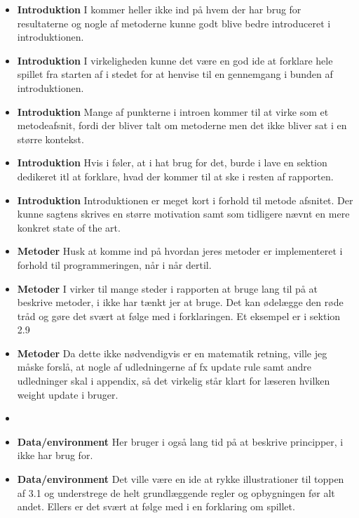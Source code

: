 \documentclass[11pt, fleqn, titlepage]{article}
\begin{document}
\begin{itemize}
		\item \textbf{Introduktion} I kommer heller ikke ind på hvem der har brug for resultaterne og nogle af metoderne kunne godt blive bedre introduceret i introduktionen.
		
		\item \textbf{Introduktion} I virkeligheden kunne det være en god ide at forklare hele spillet fra starten af i stedet for at henvise til en gennemgang i bunden af introduktionen.
		
		\item \textbf{Introduktion} Mange af punkterne i introen kommer til at virke som et metodeafsnit, fordi der bliver talt om metoderne men det ikke bliver sat i en større kontekst.
		
		\item \textbf{Introduktion} Hvis i føler, at i hat brug for det, burde i lave en sektion dedikeret itl at forklare, hvad der kommer til at ske i resten af rapporten.
		
		\item \textbf{Introduktion} Introduktionen er meget kort i forhold til metode afsnitet. Der kunne sagtens skrives en større motivation samt som tidligere nævnt en mere konkret state of the art.
		
		\item \textbf{Metoder} Husk at komme ind på hvordan jeres metoder er implementeret i forhold til programmeringen, når i når dertil.
		
		\item \textbf{Metoder} I virker til mange steder i rapporten at bruge lang til på at beskrive metoder, i ikke har tænkt jer at bruge. Det kan ødelægge den røde tråd og gøre det svært at følge med i forklaringen. Et eksempel er i sektion 2.9
		
		\item \textbf{Metoder} Da dette ikke nødvendigvis er en matematik retning, ville jeg måske forslå, at nogle af udledningerne af fx update rule samt andre udledninger skal i appendix, så det virkelig står klart for læseren hvilken weight update i bruger. 
		
		\item 
		
		\item \textbf{Data/environment} Her bruger i også lang tid på at beskrive principper, i ikke har brug for.
		
		\item \textbf{Data/environment} Det ville være en ide at rykke illustrationer til toppen af 3.1 og understrege de helt grundlæggende regler og opbygningen før alt andet. Ellers er det svært at følge med i en forklaring om spillet.
		

\end{itemize}
\end{document}
